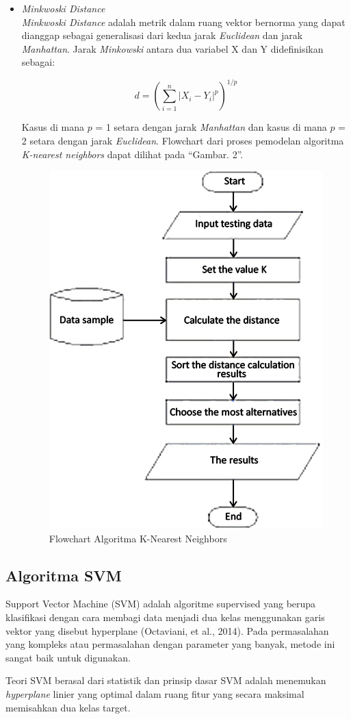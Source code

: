 \documentclass[conference]{IEEEtran}
\begin{document}
\begin{itemize}
\item \emph{Minkwoski Distance}\\
\emph{Minkwoski Distance} adalah metrik dalam ruang vektor bernorma yang dapat dianggap sebagai generalisasi dari kedua jarak \emph{Euclidean} dan jarak \emph{Manhattan}. Jarak \emph{Minkowski} antara dua variabel X dan Y didefinisikan sebagai:

\begin{equation*}
d = (\sum^{n}_{i=1} | X_i-Y_i |^p)^{1/p}
\label{eq3}
\end{equation*}

Kasus di mana $p$ = 1 setara dengan jarak \emph{Manhattan} dan kasus di mana $p$ = 2 setara dengan jarak \emph{Euclidean}.
Flowchart dari proses pemodelan algoritma \emph{K-nearest neighbors} dapat dilihat pada ``Gambar. 2''\cite{lubis2020optimization}.\vspace{6pt}
\begin{figure}
\centering
\includegraphics[width=.4\textwidth]{Gambar/gambarkn.jpg}
\caption{Flowchart Algoritma K-Nearest Neighbors}
\end{figure}
\end{itemize}

\subsection{Algoritma SVM}
Support Vector Machine (SVM) adalah algoritme supervised yang berupa klasifikasi dengan cara membagi data menjadi dua kelas menggunakan garis vektor yang disebut hyperplane (Octaviani, et al., 2014). Pada permasalahan yang kompleks atau permasalahan dengan parameter yang banyak, metode ini sangat baik untuk digunakan.

Teori SVM berasal dari statistik dan prinsip dasar SVM adalah menemukan \emph{hyperplane} linier yang optimal dalam ruang fitur yang secara maksimal memisahkan dua kelas target\cite{hasan}.
\end{document}
